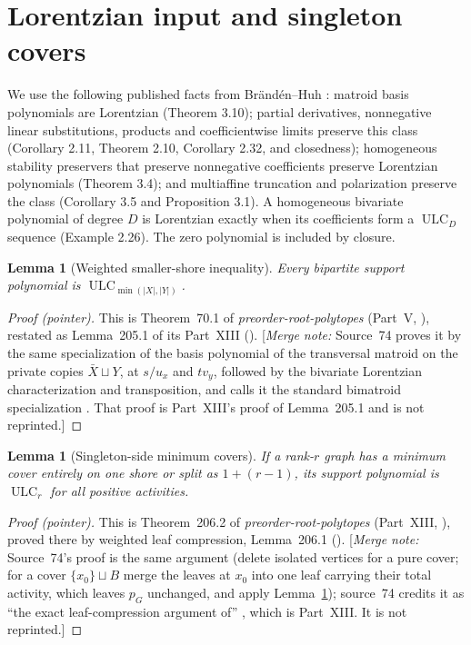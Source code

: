 \documentclass[11pt,a4paper]{article}
\newtheorem{lemma}[theorem]{Lemma}
\theoremstyle{remark}\newtheorem{remark}[theorem]{Remark}
\newcommand{\ULC}{\operatorname{ULC}}      %
\newcommand{\mnote}[1]{[\textit{Merge note:} #1]}
\newcommand{\prp}{\emph{preorder-root-polytopes}}
\begin{document}
\section{Lorentzian input and singleton covers}\label{mrn:w:rf:sec:lorentz}
We use the following published facts from Br\"and\'en--Huh \cite{b:BH}: matroid basis polynomials are Lorentzian (Theorem 3.10); partial derivatives, nonnegative linear substitutions, products and coefficientwise limits preserve this class (Corollary 2.11, Theorem 2.10, Corollary 2.32, and closedness); homogeneous stability preservers that preserve nonnegative coefficients preserve Lorentzian polynomials (Theorem 3.4); and multiaffine truncation and polarization preserve the class (Corollary 3.5 and Proposition 3.1). A homogeneous bivariate polynomial of degree $D$ is Lorentzian exactly when its coefficients form a $\ULC_D$ sequence (Example 2.26). The zero polynomial is included by closure.

\begin{lemma}[Weighted smaller-shore inequality]\label{mrn:w:rf:lem:small}
Every bipartite support polynomial is $\ULC_{\min(|X|,|Y|)}$.
\end{lemma}
\begin{proof}[Proof (pointer)]
This is Theorem~70.1 of \prp{} (Part~V, ), restated as Lemma~205.1 of its Part~XIII (). \mnote{Source~74 proves it by the same specialization of the basis polynomial of the transversal matroid on the private copies $\bar X\sqcup Y$, at $s/u_x$ and $tv_y$, followed by the bivariate Lorentzian characterization and transposition, and calls it the standard bimatroid specialization \cite{b:RU}. That proof is Part~XIII's proof of Lemma~205.1 and is not reprinted.}
\end{proof}

\begin{lemma}[Singleton-side minimum covers]\label{mrn:w:rf:lem:singleton}
If a rank-$r$ graph has a minimum cover entirely on one shore or split as $1+(r-1)$, its support polynomial is $\ULC_r$ for all positive activities.
\end{lemma}
\begin{proof}[Proof (pointer)]
This is Theorem~206.2 of \prp{} (Part~XIII, ), proved there by weighted leaf compression, Lemma~206.1 (). \mnote{Source~74's proof is the same argument (delete isolated vertices for a pure cover; for a cover $\{x_0\}\sqcup B$ merge the leaves at $x_0$ into one leaf carrying their total activity, which leaves $p_G$ unchanged, and apply Lemma~\ref{mrn:w:rf:lem:small}); source~74 credits it as ``the exact leaf-compression argument of'' \cite{b:LeafMS}, which is Part~XIII. It is not reprinted.}
\end{proof}
\end{document}
